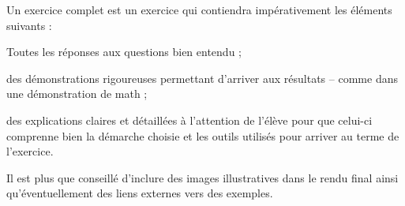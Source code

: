Un exercice complet est un exercice qui contiendra impérativement les éléments suivants :
\item Toutes les réponses aux questions bien entendu ;
\item des démonstrations rigoureuses permettant d'arriver aux résultats -- comme dans une démonstration de math ;
\item des explications claires et détaillées à l'attention de l'élève pour que celui-ci comprenne bien la démarche choisie et les outils utilisés pour arriver au terme de l'exercice.

Il est plus que conseillé d'inclure des images illustratives dans le rendu final ainsi qu'éventuellement des liens externes vers des exemples.